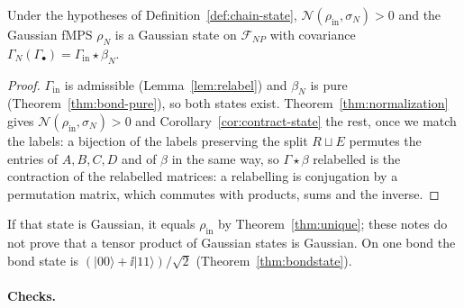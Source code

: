 \begin{theorem}\label{thm:chain-state}
Under the hypotheses of Definition~\ref{def:chain-state}, $\mathcal N(\rho_{\mathrm{in}},\sigma_N)>0$ and the
Gaussian fMPS $\rho_N$ is a Gaussian state on $\mathcal F_{NP}$ with covariance
$\Gamma_N(\Gamma_\bullet)=\Gamma_{\mathrm{in}}\star\beta_N$.
\end{theorem}
\begin{proof}
$\Gamma_{\mathrm{in}}$ is admissible (Lemma~\ref{lem:relabel}) and $\beta_N$ is pure
(Theorem~\ref{thm:bond-pure}), so both states exist. Theorem~\ref{thm:normalization} gives
$\mathcal N(\rho_{\mathrm{in}},\sigma_N)>0$ and Corollary~\ref{cor:contract-state} the rest, once
we match the labels: a bijection of the labels preserving the split $R\sqcup E$ permutes the
entries of $A,B,C,D$ and of $\beta$ in the same way, so $\Gamma\star\beta$ relabelled is the
contraction of the relabelled matrices: a relabelling is conjugation by a permutation matrix,
which commutes with products, sums and the inverse.
\end{proof}
\begin{remark}\label{rem:input}
 If that state is Gaussian, it equals
$\rho_{\mathrm{in}}$ by Theorem~\ref{thm:unique}; these notes do not prove
that a tensor product of Gaussian states is Gaussian. On one bond the bond state
is $(|00\rangle+\ii|11\rangle)/\sqrt2$ (Theorem~\ref{thm:bondstate}).
\end{remark}

\paragraph{Checks.} {\small\sloppy{}}
